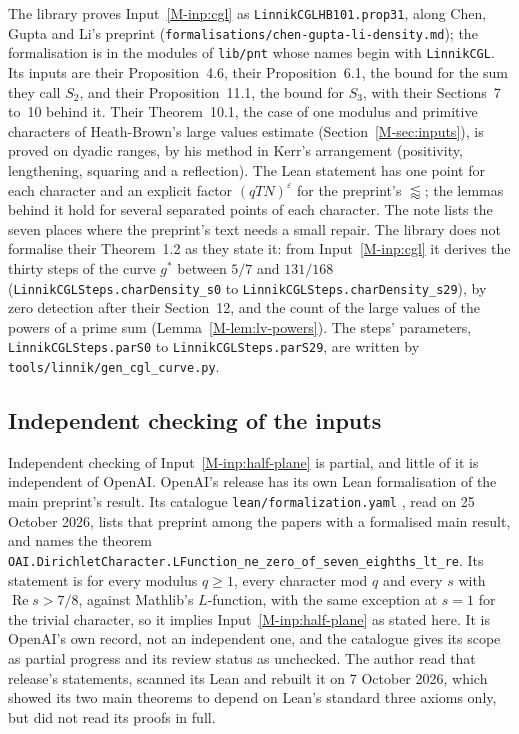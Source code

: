 \documentclass[11pt]{article}
\newcommand{\lean}[1]{\texttt{#1}}
\newcommand{\file}[1]{\nolinkurl{#1}}
\numberwithin{equation}{section}
\begin{document}
The library proves Input~\ref{M-inp:cgl} as \lean{LinnikCGLHB101.prop31}, along Chen, Gupta and Li's preprint
\cite{cgl} (\file{formalisations/chen-gupta-li-density.md}); the formalisation is in the modules of \file{lib/pnt}
whose names begin with \texttt{LinnikCGL}. Its inputs are their Proposition~4.6, their Proposition~6.1, the bound for
the sum they call $S_2$, and their Proposition~11.1, the bound for $S_3$, with their Sections~7 to~10 behind it. Their
Theorem~10.1, the case of one modulus and primitive characters of Heath-Brown's large values estimate \cite{hb79b}
(Section~\ref{M-sec:inputs}), is proved on dyadic ranges, by his method in Kerr's arrangement \cite{kerr} (positivity,
lengthening, squaring and a reflection). The Lean statement has one point for each character and an explicit factor
$(qTN)^\varepsilon$ for the preprint's $\lessapprox$; the lemmas behind it hold for several separated points of each
character. The note lists the seven places where the preprint's text needs a small repair. The library does not
formalise their Theorem~1.2 as they state it: from Input~\ref{M-inp:cgl} it derives the thirty steps of the curve $g^*$
between $5/7$ and $131/168$ (\lean{LinnikCGLSteps.charDensity\_s0} to \lean{LinnikCGLSteps.charDensity\_s29}), by
zero detection after their Section~12, and the count of the large values of the powers of a prime sum
(Lemma~\ref{M-lem:lv-powers}). The steps' parameters, \lean{LinnikCGLSteps.parS0} to \lean{LinnikCGLSteps.parS29},
are written by \file{tools/linnik/gen\_cgl\_curve.py}.

\subsection*{Independent checking of the inputs}

Independent checking of Input~\ref{M-inp:half-plane} is partial, and little of it is independent of OpenAI. OpenAI's
release has its own Lean formalisation of the main preprint's result. Its catalogue \texttt{lean/formalization.yaml}
\cite{openai-lean}, read on 25 October 2026, lists that preprint among the papers with a formalised main result, and
names the theorem \lean{OAI.DirichletCharacter.\allowbreak LFunction\_ne\_zero\_of\_seven\_eighths\_lt\_re}. Its
statement is for every modulus $q \ge 1$, every character mod $q$ and every $s$ with $\operatorname{Re} s > 7/8$,
against Mathlib's $L$-function, with the same exception at $s = 1$ for the trivial character, so it implies
Input~\ref{M-inp:half-plane} as stated here. It is OpenAI's own record, not an independent one, and the catalogue gives
its scope as partial progress and its review status as unchecked. The author read that release's statements,
scanned its Lean and rebuilt it on 7 October 2026, which showed its two main theorems to depend on Lean's standard
three axioms only, but did not read its proofs in full.
\end{document}

